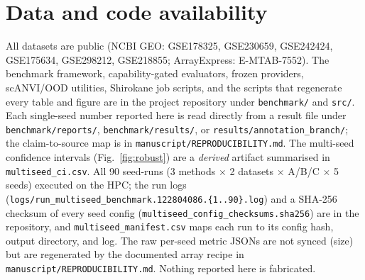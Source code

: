 \documentclass[11pt]{article}
\newcommand{\code}[1]{\texttt{\small #1}}
\begin{document}
\section{Data and code availability}
\label{sec:repro}
All datasets are public (NCBI GEO: GSE178325, GSE230659, GSE242424, GSE175634,
GSE298212, GSE218855; ArrayExpress: E-MTAB-7552). The benchmark framework,
capability-gated evaluators, frozen providers, scANVI/OOD utilities, Shirokane job
scripts, and the scripts that regenerate every table and figure are in the project
repository under \code{benchmark/} and \code{src/}. Each single-seed number reported
here is read directly from a result file under \code{benchmark/reports/},
\code{benchmark/results/}, or \code{results/annotation\_branch/}; the claim-to-source
map is in \code{manuscript/REPRODUCIBILITY.md}. The multi-seed confidence intervals
(Fig.~\ref{fig:robust}) are a \emph{derived} artifact summarised in
\code{multiseed\_ci.csv}. All 90 seed-runs (3 methods $\times$ 2 datasets $\times$
A/B/C $\times$ 5 seeds) executed on the HPC; the run logs
(\code{logs/run\_multiseed\_benchmark.122804086.\{1..90\}.log}) and a SHA-256 checksum
of every seed config (\code{multiseed\_config\_checksums.sha256}) are in the repository,
and \code{multiseed\_manifest.csv} maps each run to its config hash, output directory,
and log. The raw per-seed metric JSONs are not synced (size) but are regenerated by the
documented array recipe in \code{manuscript/REPRODUCIBILITY.md}. Nothing reported here
is fabricated.
\end{document}
